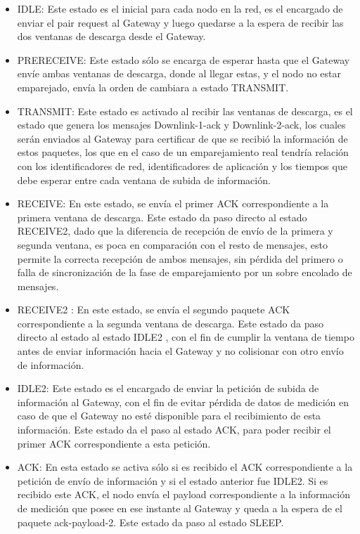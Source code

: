 \begin{justify}
\begin{itemize}
\item IDLE: Este estado es el inicial para cada nodo en la red, es el encargado de enviar el pair request al Gateway y luego quedarse a la espera de recibir las dos ventanas de descarga desde el Gateway.
\item PRERECEIVE: Este estado sólo se encarga de esperar hasta que el Gateway envíe ambas ventanas de descarga, donde al llegar estas, y el nodo no estar emparejado, envía la orden de cambiara a estado TRANSMIT.
\item TRANSMIT: Este estado es activado al recibir las ventanas de descarga, es el estado que genera los mensajes Downlink-1-ack y Downlink-2-ack, los cuales serán enviados al Gateway para certificar de que se recibió la información de estos paquetes, los que en el caso de un emparejamiento real tendría relación con los identificadores de red, identificadores de aplicación y los tiempos que debe esperar entre cada ventana de subida de información.
\item RECEIVE: En este estado, se envía el primer ACK correspondiente a la primera ventana de descarga. Este estado da paso directo al estado RECEIVE2, dado que la diferencia de recepción de envío de la primera y segunda ventana, es poca en comparación con el resto de mensajes, esto permite la correcta recepción de ambos mensajes, sin pérdida del primero o falla de sincronización de la fase de emparejamiento por un sobre encolado de mensajes.
\item RECEIVE2 : En este estado, se envía el segundo paquete ACK correspondiente a la segunda ventana de descarga. Este estado da paso directo al estado al estado IDLE2 , con el fin de cumplir la ventana de tiempo antes de enviar información hacia el Gateway y no colisionar con otro envío de información.
\item IDLE2: Este estado es el encargado de enviar la petición de subida de información al Gateway, con el fin de evitar pérdida de datos de medición en caso de que el Gateway no esté disponible para el recibimiento de esta información. Este estado da el paso al estado ACK, para poder recibir el primer ACK correspondiente a esta petición.
\item ACK: En esta estado se activa sólo si es recibido el ACK correspondiente a la petición de envío de información y si el estado anterior fue IDLE2. Si es recibido este ACK, el nodo envía el payload correspondiente a la información de medición que posee en ese instante al Gateway y queda a la espera de el paquete ack-payload-2. Este estado da paso al estado SLEEP.

\end{itemize}
\end{justify}
